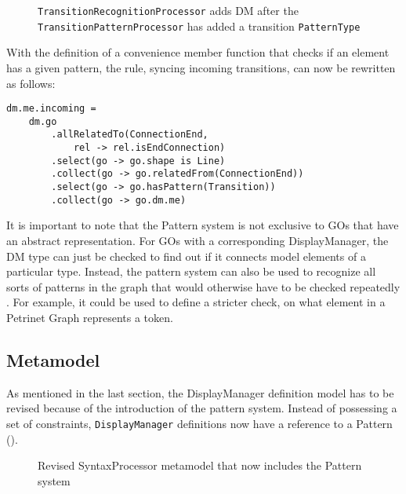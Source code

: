 \begin{figure}[ht]
  \centering
  
  \caption{\texttt{TransitionRecognitionProcessor} adds DM after the \texttt{TransitionPatternProcessor} has added a transition \texttt{PatternType}}
  \label{fig:Transition-Kind-Recognition}
\end{figure}

With the definition of a convenience member function that checks if an element has a given pattern, the rule, syncing incoming transitions, can now be rewritten as follows:
\begin{lstlisting}[captionpos=b,caption={Improved incoming transition rule, which also filters for elements that match the \texttt{Transition} pattern.}]
dm.me.incoming = 
    dm.go
        .allRelatedTo(ConnectionEnd,
            rel -> rel.isEndConnection)
        .select(go -> go.shape is Line)
        .collect(go -> go.relatedFrom(ConnectionEnd))
        .select(go -> go.hasPattern(Transition))
        .collect(go -> go.dm.me)
\end{lstlisting}


It is important to note that the Pattern system is not exclusive to GOs that have an abstract representation. For GOs with a corresponding DisplayManager, the DM type can just be checked to find out if it connects model elements of a particular type. Instead, the pattern system can also be used to recognize all sorts of patterns in the graph that would otherwise have to be checked repeatedly . For example, it could be used to define a stricter check, on what element in a Petrinet Graph represents a token.

\subsection{Metamodel}
As mentioned in the last section, the DisplayManager definition model has to be revised because of the introduction of the pattern system. Instead of possessing a set of constraints, \texttt{DisplayManager} definitions now have a reference to a Pattern ().

\begin{figure}
  \centering
  
  \caption{Revised SyntaxProcessor metamodel that now includes the Pattern system}
  \label{fig:revised-syntax-model}
\end{figure}


